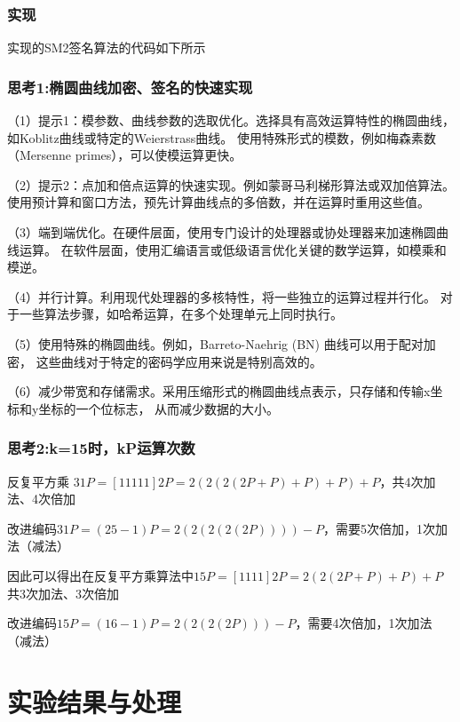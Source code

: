 \documentclass[a4paper,11pt,UTF8]{ctexart}
\begin{document}
        \subsubsection{实现}
          实现的SM2签名算法的代码如下所示
          
        \subsubsection{思考1:椭圆曲线加密、签名的快速实现}
          （1）提示1：模参数、曲线参数的选取优化。选择具有高效运算特性的椭圆曲线，如Koblitz曲线或特定的Weierstrass曲线。
          使用特殊形式的模数，例如梅森素数（Mersenne primes），可以使模运算更快。\par
          （2）提示2：点加和倍点运算的快速实现。例如蒙哥马利梯形算法或双加倍算法。
          使用预计算和窗口方法，预先计算曲线点的多倍数，并在运算时重用这些值。\par
          （3）端到端优化。在硬件层面，使用专门设计的处理器或协处理器来加速椭圆曲线运算。
          在软件层面，使用汇编语言或低级语言优化关键的数学运算，如模乘和模逆。\par
          （4）并行计算。利用现代处理器的多核特性，将一些独立的运算过程并行化。
          对于一些算法步骤，如哈希运算，在多个处理单元上同时执行。\par
          （5）使用特殊的椭圆曲线。例如，Barreto-Naehrig (BN) 曲线可以用于配对加密，
          这些曲线对于特定的密码学应用来说是特别高效的。\par
          （6）减少带宽和存储需求。采用压缩形式的椭圆曲线点表示，只存储和传输x坐标和y坐标的一个位标志，
          从而减少数据的大小。\par

        \subsubsection{思考2:k=15时，kP运算次数}
          反复平方乘 $31P=[11111]2P=2(2(2(2P+P)+P)+P)+P$，共4次加法、4次倍加\par
          改进编码$31P=(25-1)P=2(2(2(2(2P))))-P$，需要5次倍加，1次加法（减法）\par
          因此可以得出在反复平方乘算法中$15P=[1111]2P=2(2(2P+P)+P)+P$共3次加法、3次倍加\par
          改进编码$15P=(16-1)P=2(2(2(2P)))-P$，需要4次倍加，1次加法（减法）\par

\section{实验结果与处理}
\end{document}
